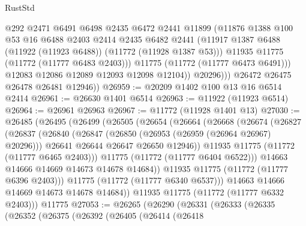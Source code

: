 \begin{lexlean}{RustStd}
\begin{coremodule}
                    @292
                    @2471
                    @6491
                    @6498
                    @2435
                    @6472
                    @2441
                    @11899
                    (@11876
                      @1388
                      @100
                      @53
                      @16
                      @6488
                      @2403
                      @2414
                      @2435
                      @6482
                      @2441
                      (@11917 @1387 @6488 (@11922 (@11923 @6488)) (@11772 (@11928 @1387 @53)))
                      @11935
                      @11775
                      (@11772 (@11777 @6483 @2403)))
                    @11775
                    (@11772 (@11777 @6473 @6491)))
                  @12083
                  @12086
                  @12089
                  @12093
                  @12098
                  @12104))
              @20296)))
        @26472
        @26475
        @26478
        @26481
        @12946))
@26959 := @20209 @1402 @100 @13 @16 @6514 @2414
@26961 := @26630 @1401 @6514
@26963 := @11922 (@11923 @6514)
@26964 := @26961 @26963
@26967 := @11772 (@11928 @1401 @13)
@27030 := @26485
    (@26495
      (@26499
        (@26505
          (@26654
            (@26664
              (@26668
                (@26674
                  (@26827
                    (@26837
                      (@26840
                        (@26847
                          (@26850 (@26953 (@26959 (@26964 @26967) @20296)))
                          @26641
                          @26644
                          @26647
                          @26650
                          @12946))
                      @11935
                      @11775
                      (@11772 (@11777 @6465 @2403)))
                    @11775
                    (@11772 (@11777 @6404 @6522)))
                  @14663
                  @14666
                  @14669
                  @14673
                  @14678
                  @14684))
              @11935
              @11775
              (@11772 (@11777 @6396 @2403)))
            @11775
            (@11772 (@11777 @6340 @6537)))
          @14663
          @14666
          @14669
          @14673
          @14678
          @14684))
      @11935
      @11775
      (@11772 (@11777 @6332 @2403)))
    @11775
@27053 := @26265
    (@26290
      (@26331
        (@26333
          (@26335
            (@26352
              (@26375
                (@26392
                  (@26405
                    (@26414
                      (@26418

\end{coremodule}
\end{lexlean}
